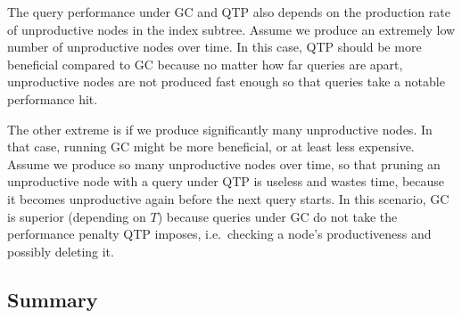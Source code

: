 \documentclass[abstracton,12pt]{scrartcl}
\theoremstyle{definition}
\begin{document}
The query performance under GC and QTP also depends
on the production rate of unproductive nodes
in the index subtree.
Assume we produce an extremely low number of unproductive nodes
over time. In this case, QTP should be more beneficial compared to GC 
because no matter how far queries are apart, unproductive nodes
are not produced fast enough so that queries take a notable performance hit.

The other extreme is if we produce significantly many unproductive nodes.
In that case, running GC might be more beneficial, or at least less expensive.
Assume we produce so many unproductive nodes over time, so that
pruning an unproductive node with a query under QTP is useless
and wastes time, because it becomes unproductive again before
the next query starts. In this scenario, GC is superior (depending on $T$) 
because queries under GC do not take the performance penalty QTP imposes,
i.e.\ checking a node's productiveness and possibly deleting it.


\newpage

\subsection{Summary}
\end{document}
